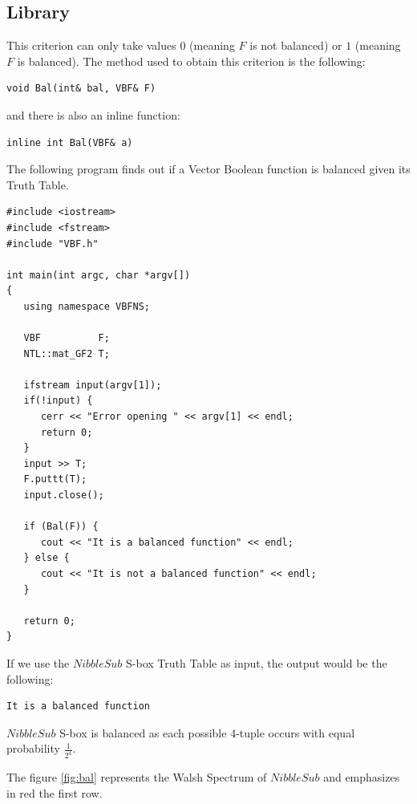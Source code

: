 \subsection{Library}

This criterion can only take values $0$ (meaning $F$ is not balanced) or $1$ (meaning $F$ is balanced). The method used to obtain this criterion is the following:

\begin{verbatim}
void Bal(int& bal, VBF& F)
\end{verbatim}

and there is also an inline function:

\begin{verbatim}
inline int Bal(VBF& a)	
\end{verbatim}

\begin{example}
The following program finds out if a Vector Boolean function is balanced given its Truth Table.

\begin{verbatim}
#include <iostream>
#include <fstream>
#include "VBF.h"

int main(int argc, char *argv[])
{
   using namespace VBFNS;

   VBF          F;
   NTL::mat_GF2 T;

   ifstream input(argv[1]);
   if(!input) {
      cerr << "Error opening " << argv[1] << endl;
      return 0;
   }
   input >> T;
   F.puttt(T);
   input.close();

   if (Bal(F)) {
      cout << "It is a balanced function" << endl;
   } else {
      cout << "It is not a balanced function" << endl;
   }    

   return 0;
}
\end{verbatim}

If we use the $NibbleSub$ S-box Truth Table as input, the output would be the following:

\begin{verbatim}
It is a balanced function
\end{verbatim}

$NibbleSub$ S-box is balanced as each possible 4-tuple occurs with equal probability $\frac{1}{2^4}$.

The figure \ref{fig:bal} represents the Walsh Spectrum of $NibbleSub$ and emphasizes in red the first row.


\end{example}
